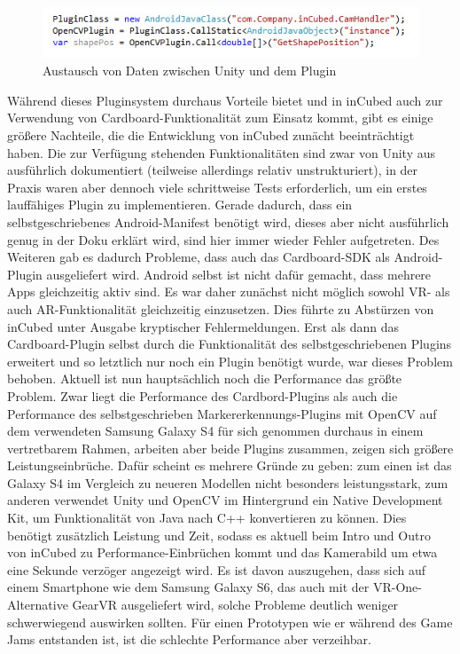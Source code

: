 \begin{figure}[!htbp]%
	\centering
		\includegraphics[width=1.0\textwidth]{images/code}
	\caption{Austausch von Daten zwischen Unity und dem Plugin}
	\label{fig:Code}
\end{figure}

Während dieses Pluginsystem durchaus Vorteile bietet und in inCubed auch zur Verwendung von Cardboard-Funktionalität zum Einsatz kommt, gibt es einige größere Nachteile, die die Entwicklung von inCubed zunächt beeinträchtigt haben. Die zur Verfügung stehenden Funktionalitäten sind zwar von Unity aus ausführlich dokumentiert (teilweise allerdings relativ unstrukturiert), in der Praxis waren aber dennoch viele schrittweise Tests erforderlich, um ein erstes lauffähiges Plugin zu implementieren. Gerade dadurch, dass ein selbstgeschriebenes Android-Manifest benötigt wird, dieses aber nicht ausführlich genug in der Doku erklärt wird, sind hier immer wieder Fehler aufgetreten. Des Weiteren gab es dadurch Probleme, dass auch das Cardboard-SDK als Android-Plugin ausgeliefert wird. Android selbst ist nicht dafür gemacht, dass mehrere Apps gleichzeitig aktiv sind. Es war daher zunächst nicht möglich sowohl VR- als auch AR-Funktionalität gleichzeitig einzusetzen. Dies führte zu Abstürzen von inCubed unter Ausgabe kryptischer Fehlermeldungen. Erst als dann das Cardboard-Plugin selbst durch die Funktionalität des selbstgeschriebenen Plugins erweitert und so letztlich nur noch ein Plugin benötigt wurde, war dieses Problem behoben. Aktuell ist nun hauptsächlich noch die Performance das größte Problem. Zwar liegt die Performance des Cardbord-Plugins als auch die Performance des selbstgeschrieben Markererkennungs-Plugins mit OpenCV auf dem verwendeten Samsung Galaxy S4 für sich genommen durchaus in einem vertretbarem Rahmen, arbeiten aber beide Plugins zusammen, zeigen sich größere Leistungseinbrüche. Dafür scheint es mehrere Gründe zu geben: zum einen ist das Galaxy S4 im Vergleich zu neueren Modellen nicht besonders leistungsstark, zum anderen verwendet Unity und OpenCV im Hintergrund ein Native Development Kit, um Funktionalität von Java nach C++ konvertieren zu können. Dies benötigt zusätzlich Leistung und Zeit, sodass es aktuell beim Intro und Outro von inCubed zu Performance-Einbrüchen kommt und das Kamerabild um etwa eine Sekunde verzöger angezeigt wird. Es ist davon auszugehen, dass sich auf einem Smartphone wie dem Samsung Galaxy S6, das auch mit der VR-One-Alternative GearVR ausgeliefert wird, solche Probleme deutlich weniger schwerwiegend auswirken sollten. Für einen Prototypen wie er während des Game Jams entstanden ist, ist die schlechte Performance aber verzeihbar.
